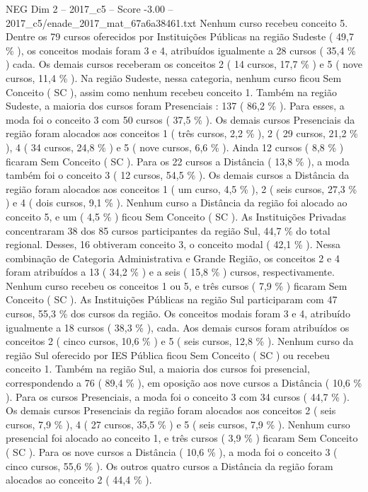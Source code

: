 \begin{textsample}{NEG Dim 2 – 2017\_c5 – Score -3.00 – 2017\_c5/enade\_2017\_mat\_67a6a38461.txt}
Nenhum curso recebeu conceito 5.
Dentre os 79 cursos oferecidos por Instituições Públicas na região Sudeste ( 49,7 \% ), os conceitos modais foram 3 e 4, atribuídos igualmente a 28 cursos ( 35,4 \% ) cada.
Os demais cursos receberam os conceitos 2 ( 14 cursos, 17,7 \% ) e 5 ( nove cursos, 11,4 \% ).
Na região Sudeste, nessa categoria, nenhum curso ficou Sem Conceito ( SC ), assim como nenhum recebeu conceito 1.
Também na região Sudeste, a maioria dos cursos foram Presenciais : 137 ( 86,2 \% ).
Para esses, a moda foi o conceito 3 com 50 cursos ( 37,5 \% ).
Os demais cursos Presenciais da região foram alocados aos conceitos 1 ( três cursos, 2,2 \% ), 2 ( 29 cursos, 21,2 \% ), 4 ( 34 cursos, 24,8 \% ) e 5 ( nove cursos, 6,6 \% ).
Ainda 12 cursos ( 8,8 \% ) ficaram Sem Conceito ( SC ).
Para os 22 cursos a Distância ( 13,8 \% ), a moda também foi o conceito 3 ( 12 cursos, 54,5 \% ).
Os demais cursos a Distância da região foram alocados aos conceitos 1 ( um curso, 4,5 \% ), 2 ( seis cursos, 27,3 \% ) e 4 ( dois cursos, 9,1 \% ).
Nenhum curso a Distância da região foi alocado ao conceito 5, e um ( 4,5 \% ) ficou Sem Conceito ( SC ).
As Instituições Privadas concentraram 38 dos 85 cursos participantes da região Sul, 44,7 \% do total regional.
Desses, 16 obtiveram conceito 3, o conceito modal ( 42,1 \% ).
Nessa combinação de Categoria Administrativa e Grande Região, os conceitos 2 e 4 foram atribuídos a 13 ( 34,2 \% ) e a seis ( 15,8 \% ) cursos, respectivamente.
Nenhum curso recebeu os conceitos 1 ou 5, e três cursos ( 7,9 \% ) ficaram Sem Conceito ( SC ).
As Instituições Públicas na região Sul participaram com 47 cursos, 55,3 \% dos cursos da região.
Os conceitos modais foram 3 e 4, atribuído igualmente a 18 cursos ( 38,3 \% ), cada.
Aos demais cursos foram atribuídos os conceitos 2 ( cinco cursos, 10,6 \% ) e 5 ( seis cursos, 12,8 \% ).
Nenhum curso da região Sul oferecido por IES Pública ficou Sem Conceito ( SC ) ou recebeu conceito 1.
Também na região Sul, a maioria dos cursos foi presencial, correspondendo a 76 ( 89,4 \% ), em oposição aos nove cursos a Distância ( 10,6 \% ).
Para os cursos Presenciais, a moda foi o conceito 3 com 34 cursos ( 44,7 \% ).
Os demais cursos Presenciais da região foram alocados aos conceitos 2 ( seis cursos, 7,9 \% ), 4 ( 27 cursos, 35,5 \% ) e 5 ( seis cursos, 7,9 \% ).
Nenhum curso presencial foi alocado ao conceito 1, e três cursos ( 3,9 \% ) ficaram Sem Conceito ( SC ).
Para os nove cursos a Distância ( 10,6 \% ), a moda foi o conceito 3 ( cinco cursos, 55,6 \% ).
Os outros quatro cursos a Distância da região foram alocados ao conceito 2 ( 44,4 \% ).

\end{textsample}
